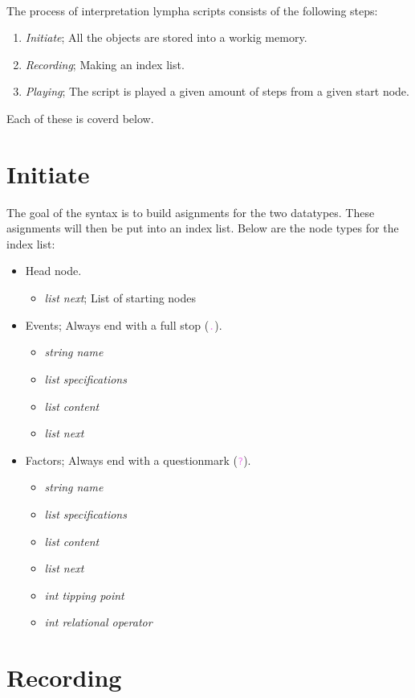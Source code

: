 \documentclass[15pt,a4paper,oneside]{article}
\newcommand{\code}[1]{{\textcolor{violet}{\texttt{\small #1}}}}
\begin{document}
\newpage
\ \\
The process of interpretation {\sc lympha} scripts consists of the following steps:
\begin{enumerate}
\item {\it Initiate}; All the objects are stored into a workig memory.
\item {\it Recording}; Making an index list.
\item {\it Playing}; The script is played a given amount of steps from a given start node.
\end{enumerate}
Each of these is coverd below.
\section{Initiate}
The goal of the syntax is to build asignments for the two datatypes. These asignments will then be put into an index list. Below are the node types for the index list:

\begin{itemize}
\item Head node.
\begin{itemize}
\item {\it list next}; List of starting nodes
\end{itemize}
\item Events; Always end with a full stop (\code{.}).
\begin{itemize}
\item {\it string name}
\item {\it list specifications}
\item {\it list content}
\item {\it list next}
\end{itemize}
\item Factors; Always end with a questionmark (\code{?}).
\begin{itemize}
\item {\it string name}
\item {\it list specifications}
\item {\it list content}
\item {\it list next}
\item {\it int tipping point}
\item {\it int relational operator}
\end{itemize}
\end{itemize}

\section{Recording}
\end{document}
